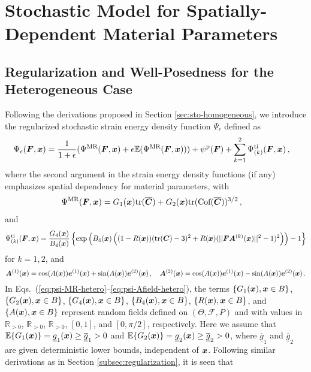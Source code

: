 \section{Stochastic Model for Spatially-Dependent Material Parameters}\label{sec:sto-heterogeneous}

\subsection{Regularization and Well-Posedness for the Heterogeneous Case}\label{subsec:reg-well-posedness-heterogeneous}

Following the derivations proposed in Section \ref{sec:sto-homogeneous}, we introduce the regularized stochastic strain energy density function $\Psi_{\epsilon}$ defined as
\begin{align}
    \Psi_{\epsilon}(\boldsymbol{F}, \boldsymbol{x}) & = \frac{1}{1+\epsilon}( \Psi^{\text{MR}}(\boldsymbol{F}, \boldsymbol{x}) + \epsilon \mathbb{E}(\Psi^{\text{MR}}(\boldsymbol{F}, \boldsymbol{x}))) + \psi^\text{p}(\boldsymbol{F}) + \sum_{k=1}^{2} \Psi_{(k)}^\text{ti}(\boldsymbol{F}, \boldsymbol{x})\,,\label{eq:regularized-SEF}
\end{align}
where the second argument in the strain energy density functions (if any) emphasizes spatial dependency for material parameters, with
\begin{align}\label{eq:psi-MR-hetero}
    \Psi^{\text{MR}}(\boldsymbol{F}, \boldsymbol{x}) &= G_1(\boldsymbol{x}) \textnormal{tr}(\overline{\boldsymbol{C}}) + G_2(\boldsymbol{x}) \textnormal{tr}(\text{Cof}(\overline{\boldsymbol{C}}))^{3/2}\,,
\end{align}
and
\begin{align}\label{eq:psi-AN-hetero}
    \Psi_{(k)}^\text{ti}(\boldsymbol{F}, \boldsymbol{x}) = \frac{G_4(\boldsymbol{x})}{B_4(\boldsymbol{x})} \left\{ \exp \left(B_4(\boldsymbol{x}) \left( (1-R(\boldsymbol{x}))(\textnormal{tr}(\boldsymbol{C})-3)^2 + R(\boldsymbol{x}) ( \vert \vert \boldsymbol{F} \boldsymbol{A}^{(k)}(\boldsymbol{x}) \vert \vert ^2-1 )^2 \right) \right) - 1\right\}
\end{align}  
for $k = 1,2$, and
\begin{equation}\label{eq:psi-Afield-hetero}  
    \boldsymbol{A}^{(1)}(\boldsymbol{x}) = \cos(A(\boldsymbol{x})) \boldsymbol{e}^{(1)}(\boldsymbol{x}) + \sin(A(\boldsymbol{x}))\boldsymbol{e}^{(2)}(\boldsymbol{x})\,, \quad \boldsymbol{A}^{(2)}(\boldsymbol{x}) = \cos(A(\boldsymbol{x})) \boldsymbol{e}^{(1)}(\boldsymbol{x}) - \sin(A(\boldsymbol{x}))\boldsymbol{e}^{(2)}(\boldsymbol{x})\,.
\end{equation}
In Eqs.~(\ref{eq:psi-MR-hetero}--\ref{eq:psi-Afield-hetero}), the terms $\{G_1(\boldsymbol{x}), \boldsymbol{x} \in B\}$, $\{G_2(\boldsymbol{x}), \boldsymbol{x} \in B\}$, $\{G_4(\boldsymbol{x}), \boldsymbol{x} \in B\}$, $\{B_4(\boldsymbol{x}), \boldsymbol{x} \in B\}$, $\{R(\boldsymbol{x}), \boldsymbol{x} \in B\}$, and $\{A(\boldsymbol{x}), \boldsymbol{x} \in B\}$ represent random fields defined on $(\Theta, \mathcal{F}, P)$ and with values in $\mathbb{R}_{> 0}$, $\mathbb{R}_{> 0}$, $\mathbb{R}_{> 0}$, $[0,1]$, and $[0, \pi/2]$, respectively. Here we assume that $\mathbb{E}\{G_1(\boldsymbol{x})\} = \underline{g}_1(\boldsymbol{x}) \geq \underline{\overline{g}}_1 > 0$ and $\mathbb{E}\{G_2(\boldsymbol{x})\} = \underline{g}_2(\boldsymbol{x}) \geq \underline{\overline{g}}_2 > 0$, where $\underline{\overline{g}}_1$ and $\underline{\overline{g}}_2$ are given deterministic lower bounds, independent of $\boldsymbol{x}$. Following similar derivations as in Section \ref{subsec:regularization}, it is seen that
